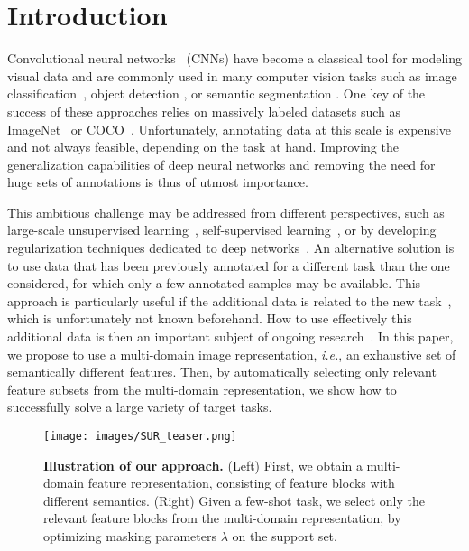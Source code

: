 \documentclass[runningheads]{llncs}
\begin{document}
\section{Introduction}
Convolutional neural networks~\cite{lecun1989backpropagation} (CNNs) have become
a classical tool for modeling visual data and are commonly used in
many computer vision tasks such as image
classification~\cite{krizhevsky2012imagenet}, object detection
\cite{blitznet,ssd,faster-rcnn}, or semantic segmentation
\cite{blitznet,long2015fully,ronneberger2015u}. One key of the success of 
these approaches relies on 
massively labeled datasets
such as ImageNet~\cite{imagenet} or COCO~\cite{coco}.
Unfortunately, annotating data at this scale is expensive and not always
feasible, depending on the task at hand. Improving the generalization
capabilities of deep neural networks and removing the need for huge sets of
annotations is thus of utmost importance.

This ambitious challenge may be addressed from different perspectives, such as
large-scale unsupervised learning~\cite{caron2018deep}, self-supervised
learning~\cite{doersch2017multi,gidaris2018unsupervised}, or by developing
regularization techniques dedicated to deep
networks~\cite{bietti2019kernel,yoshida2017spectral}. An alternative solution is
to use data that has been previously annotated for a different task than the one considered,
for which only a few annotated samples may be available.
This approach is particularly
useful if the additional data is related to
the new task~\cite{yosinski2014transferable,vtab}, which is unfortunately not known beforehand.
How to use effectively this additional data is then an important subject of ongoing
research~\cite{finn2017model,triantafillou2019meta,vtab}. In this paper, we
propose to use a multi-domain image representation, \textit{i.e.}, an
exhaustive set of semantically different features. Then, by automatically selecting only relevant
feature subsets from the multi-domain representation, we show 
how to successfully solve a large variety of target tasks.

\begin{figure}[t]
   \centering
  \texttt{[image: images/SUR\_teaser.png]}
\caption{\textbf{Illustration of our approach.} (Left) First, we obtain a
  multi-domain feature representation, consisting of feature blocks with different
  semantics. (Right) Given a few-shot task, we select only the relevant
  feature blocks from the multi-domain representation, by optimizing masking
  parameters $\lambda$ on the support set.}\label{fig:sketch_relationships}
\end{figure}
\end{document}
